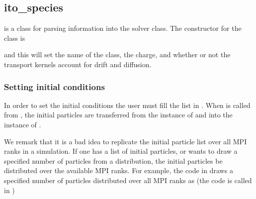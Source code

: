 \documentclass[letterpaper,10pt,english]{sphinxmanual}
\begin{document}
\subsection{ito\_species}
\label{\detokenize{Solvers/Ito:ito-species}}\label{\detokenize{Solvers/Ito:chap-ito-species}}
 is a class for parsing information into the solver class.
The constructor for the  class is

\begin{sphinxVerbatim}[commandchars=\\\{\},formatcom=\scriptsize]
           
\end{sphinxVerbatim}

and this will set the name of the class, the charge, and whether or not the transport kernels account for drift and diffusion.


\subsubsection{Setting initial conditions}
\label{\detokenize{Solvers/Ito:setting-initial-conditions}}
In order to set the initial conditions the user must fill the list  in .
When  is called from , the initial particles are transferred from the instance of  and into the instance of .

We remark that it is a bad idea to replicate the initial particle list over all MPI ranks in a simulation.
If one has a list of initial particles, or wants to draw a specified number of particles from a distribution, the initial particles  be distributed over the available MPI ranks.
For example, the code in  draws a specified number of particles distributed over all MPI ranks as (the code is called in )
\end{document}
